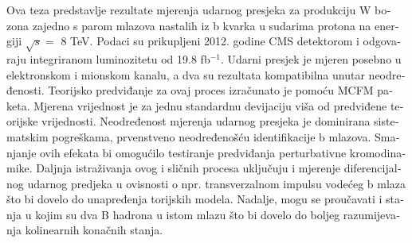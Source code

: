 \begin{otherlanguage}{croatian}
Ova teza predstavlje rezultate mjerenja udarnog presjeka za produkciju W bozona zajedno s parom mlazova nastalih iz b kvarka u sudarima protona na energiji $\sqrt{s}=$ 8 TeV. Podaci su prikupljeni 2012. godine CMS detektorom i odgovaraju integriranom luminozitetu od 19.8 fb$^{-1}$. Udarni presjek je mjeren posebno u elektronskom i mionskom kanalu, a dva su rezultata kompatibilna unutar neodređenosti. Teorijsko predviđanje za ovaj proces izračunato je pomoću MCFM paketa. Mjerena vrijednost je za jednu standardnu devijaciju viša od predviđene teorijske vrijednosti. Neodređenost mjerenja udarnog presjeka je dominirana sistematskim pogreškama, prvenstveno neodređenošću identifikacije b mlazova. Smanjanje ovih efekata bi omogućilo testiranje predviđanja perturbativne kromodinamike. Daljnja istraživanja ovog i sličnih procesa uključuju i mjerenje diferencijalnog udarnog predjeka u ovisnosti o npr. transverzalnom impulsu vodećeg b mlaza što bi dovelo do unapređenja torijskih modela. Nadalje, mogu se proučavati i stanja u kojim su dva B hadrona u istom mlazu što bi dovelo do boljeg razumijevanja kolinearnih konačnih stanja. 

\end{otherlanguage}
